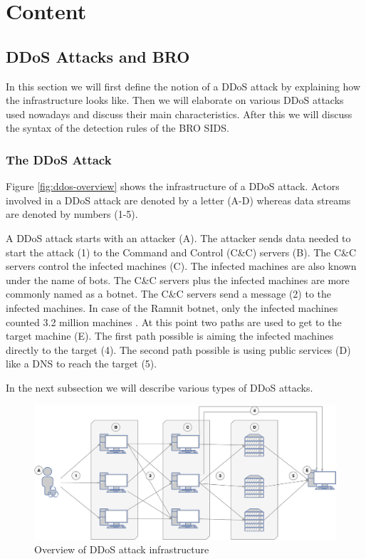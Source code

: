 \section{Content}
\label{section:content}

\subsection{DDoS Attacks and BRO}\label{subsec:ddos-and-bro}
In this section we will first define the notion of a DDoS attack by explaining how the infrastructure looks like. Then we will elaborate on various DDoS attacks used nowadays and discuss their main characteristics. After this we will discuss the syntax of the detection rules of the BRO SIDS.

\subsubsection{The DDoS Attack}
Figure \ref{fig:ddos-overview} shows the infrastructure of a DDoS attack. Actors involved in a DDoS attack are denoted by a letter (A-D) whereas data streams are denoted by numbers (1-5). 

A DDoS attack starts with an attacker (A). The attacker sends data needed to start the attack (1) to the Command and Control (C\&C) servers (B). The C\&C servers control the infected machines (C). The infected machines are also known under the name of bots. The C\&C servers plus the infected machines are more commonly named as a botnet. The C\&C servers send a message (2) to the infected machines. In case of the Ramnit botnet, only the infected machines counted 3.2 million machines \cite{europol2015}. At this point two paths are used to get to the target machine (E). The first path possible is aiming the infected machines directly to the target (4). The second path possible is using public services (D) like a DNS to reach the target (5). 

In the next subsection we will describe various types of DDoS attacks. 

\begin{figure}[H]
\centering
\includegraphics[width=\textwidth]{./images/ddos-overview.pdf}
\caption{Overview of DDoS attack infrastructure}
\end{figure}\label{fig:ddos-overview}


